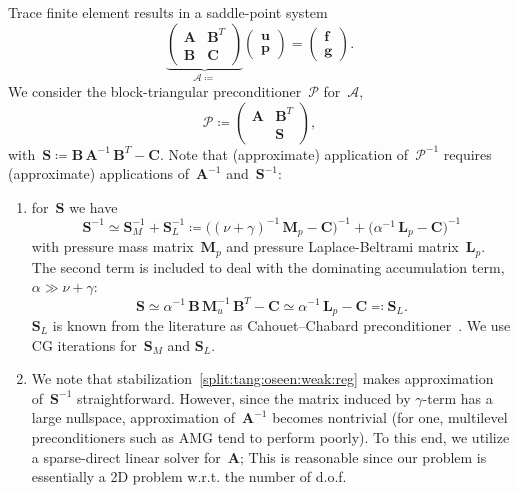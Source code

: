 \documentclass[12pt]{article}
\newcommand{\vect}[1]{\boldsymbol{\mathbf{#1}}}
\begin{document}
Trace finite element results in a saddle-point system
\begin{equation}\label{split:tang:system}
	\underbrace{\begin{pmatrix}
		\vect A & \vect B^T \\
		\vect B & \vect C\phantom{^T}
	\end{pmatrix}}_{\mathcal A \coloneqq}
	\begin{pmatrix} \vect u \\ \vect p \end{pmatrix} =
	\begin{pmatrix} \vect f \\ \vect g \end{pmatrix}. 
\end{equation}
We consider the block-triangular preconditioner~$\mathcal P$ for~$\mathcal A$,
\begin{equation}\label{split:tang:prec}
\mathcal P \coloneqq \begin{pmatrix}
	\vect A & \vect B^T \\
	        & \vect S\phantom{^T}
	\end{pmatrix},
\end{equation}
with~$\vect S \coloneqq \vect B\,\vect A^{-1}\,\vect B^T - \vect C$. Note that (approximate) application of~$\mathcal P^{-1}$ requires (approximate) applications of~$\vect A^{-1}$ and~$\vect S^{-1}$:
\begin{enumerate}
	\item for~$\vect S$ we have
		\begin{equation}\label{split:tang:prec:schur}
			\vect S^{-1} \simeq \vect S_M^{-1} + \vect S_L^{-1} \coloneqq \big((\nu + \gamma)^{-1}\,\vect M_p - \vect C\big)^{-1} + \big(\alpha^{-1}\,\vect L_p - \vect C\big)^{-1}
		\end{equation}
		with pressure mass matrix~$\vect M_p$ and pressure Laplace-Beltrami matrix~$\vect L_p$. The second term is included to deal with the dominating accumulation term, $\alpha \gg \nu + \gamma$: 
		$$
			\vect S \simeq \alpha^{-1}\,\vect B\,\vect M_u^{-1}\,\vect B^T - \vect C \simeq \alpha^{-1}\,\vect L_p - \vect C \eqqcolon \vect S_L.
		$$
		$\vect S_L$ is known from the literature as Cahouet--Chabard preconditioner~\cite{cahouet1988some}. We use CG iterations for~$\vect S_M$ and $\vect S_L$. 
	\item We note that stabilization~\eqref{split:tang:oseen:weak:reg} makes approximation of~$\vect S^{-1}$ straightforward. However, since the matrix induced by $\gamma$-term has a large nullspace, approximation of~$\vect A^{-1}$ becomes nontrivial (for one, multilevel preconditioners such as AMG tend to perform poorly). To this end, we utilize a sparse-direct linear solver for~$\vect A$; This is reasonable since our problem is essentially a 2D problem w.r.t. the number of d.o.f.	
\end{enumerate}
\end{document}
